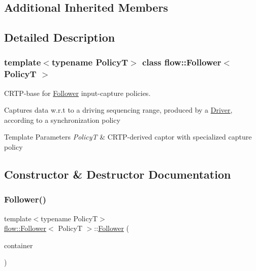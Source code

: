 \subsection*{Additional Inherited Members}


\subsection{Detailed Description}
\subsubsection*{template$<$typename PolicyT$>$\newline
class flow\+::\+Follower$<$ Policy\+T $>$}

C\+R\+T\+P-\/base for \hyperlink{classflow_1_1_follower}{Follower} input-\/capture policies. 

Captures data w.\+r.\+t to a driving sequencing range, produced by a \hyperlink{classflow_1_1_driver}{Driver}, according to a synchronization policy


\begin{DoxyTemplParams}{Template Parameters}
{\em PolicyT} & C\+R\+T\+P-\/derived captor with specialized capture policy \\
\hline
\end{DoxyTemplParams}


\subsection{Constructor \& Destructor Documentation}
\mbox{\label{classflow_1_1_follower_a4637bd6e90b3e45cd42584cc873e771e}} 
\subsubsection{\texorpdfstring{Follower()}{Follower()}}
{\footnotesize\ttfamily template$<$typename PolicyT$>$ \\
\hyperlink{classflow_1_1_follower}{flow\+::\+Follower}$<$ PolicyT $>$\+::\hyperlink{classflow_1_1_follower}{Follower} (\begin{DoxyParamCaption}\item[{const \hyperlink{classflow_1_1_follower_a2c30490de514f45d9cc287eb8baed5db}{Dispatch\+Container\+Type} \&}]{container }\end{DoxyParamCaption})\hspace{0.3cm}{\ttfamily [explicit]}}




